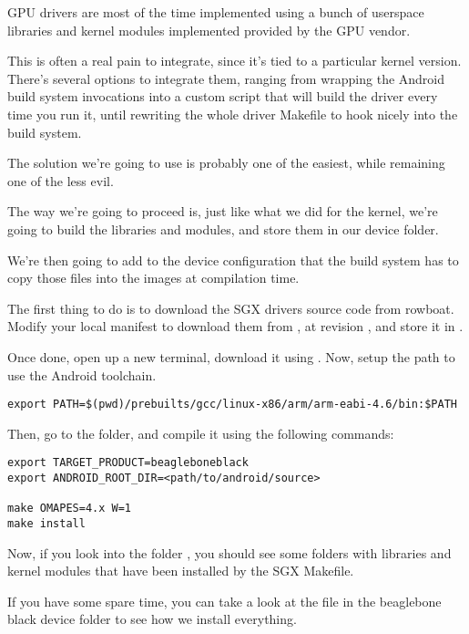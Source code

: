 GPU drivers are most of the time implemented using a bunch of
userspace libraries and kernel modules implemented provided by the GPU
vendor.

This is often a real pain to integrate, since it's tied to a
particular kernel version. There's several options to integrate them,
ranging from wrapping the Android build system invocations into a
custom script that will build the driver every time you run it, until
rewriting the whole driver Makefile to hook nicely into the build
system.

The solution we're going to use is probably one of the easiest, while
remaining one of the less evil.

The way we're going to proceed is, just like what we did for the
kernel, we're going to build the libraries and modules, and store them
in our device folder.

We're then going to add to the device configuration that the build
system has to copy those files into the images at compilation time.

The first thing to do is to download the SGX drivers source code from
rowboat. Modify your local manifest to download them from
,
at revision , and store it in
.

Once done, open up a new terminal, download it using . Now,
setup the path to use the Android toolchain.

\begin{verbatim}
export PATH=$(pwd)/prebuilts/gcc/linux-x86/arm/arm-eabi-4.6/bin:$PATH
\end{verbatim}

Then, go to the  folder, and compile it using the following
commands:

\begin{verbatim}
export TARGET_PRODUCT=beagleboneblack
export ANDROID_ROOT_DIR=<path/to/android/source>

make OMAPES=4.x W=1
make install 
\end{verbatim}

Now, if you look into the folder ,
you should see some folders with libraries and kernel modules that
have been installed by the SGX Makefile.

If you have some spare time, you can take a look at the file
 in the beaglebone black device folder to see how
we install everything.

